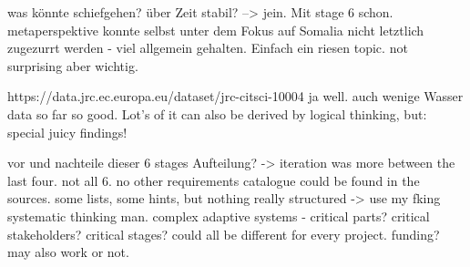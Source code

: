 
















was könnte schiefgehen?
über Zeit stabil? --> jein. Mit stage 6 schon.
metaperspektive
konnte selbst unter dem Fokus auf Somalia nicht letztlich zugezurrt werden - viel allgemein gehalten. Einfach ein riesen topic. not surprising aber wichtig.

https://data.jrc.ec.europa.eu/dataset/jrc-citsci-10004
ja well. auch wenige Wasser data 
so far so good. Lot's of it can also be derived by logical thinking, but: special juicy findings!

vor und nachteile dieser 6 stages Aufteilung?
-> iteration was more between the last four. not all 6. no other requirements catalogue could be found in the sources. some lists, some hints, but nothing really structured
-> use my fking systematic thinking man.
complex adaptive systems - critical parts? critical stakeholders? critical stages? could all be different for every project.
funding? may also work or not. 


